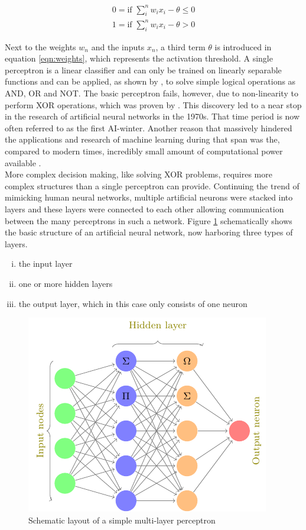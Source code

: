 \begin{subequations}
 \begin{align}
  0 = \mbox{if } \sum_i^n w_i x_i - \theta \leq 0 \\
  1 = \mbox{if } \sum_i^n w_i x_i - \theta > 0
 \end{align}
 \label{eqn:weights}
\end{subequations}


Next to the weights $w_n$ and the inputs $x_n$, a third term $\theta$ is introduced in
equation \ref{eqn:weights}, which represents the activation threshold. A single perceptron
is a linear classifier and can only be trained on linearly separable functions and can be
applied, as shown by \cite{rosenblatt1961}, to solve simple logical operations as AND, OR
and NOT. The basic perceptron fails, however, due to non-linearity to perform XOR
operations, which was proven by \cite{marvin1969}. This discovery led to a near stop in
the research of artificial neural networks in the 1970s. That time period is now often
referred to as the first AI-winter. Another reason that massively hindered the
applications and research of machine learning during that span was the, compared to
modern times, incredibly small amount of computational power available \cite{nguyen1990truck}. \\
More complex decision making, like solving XOR problems, requires more complex structures
than a single perceptron can provide. Continuing the trend of mimicking human neural
networks, multiple artificial neurons were stacked into layers and these layers were
connected to each other allowing communication between the many perceptrons in such a
network. Figure \ref{fig:nn} schematically shows the basic structure of an artificial
neural network, now harboring three types of layers.

\begin{enumerate}[(i)]
\item the input layer
\item one or more hidden layers
\item the output layer, which in this case only consists of one neuron
\end{enumerate}

\begin{figure}[H]
\centering
\includegraphics[height=.25\textheight, width=.5\textwidth]{Figures/neuralnet}
\decoRule
\caption[Schematic layout of a simple multi-layer perceptron]{Schematic layout of a simple multi-layer perceptron}
\label{fig:nn}
\end{figure}



